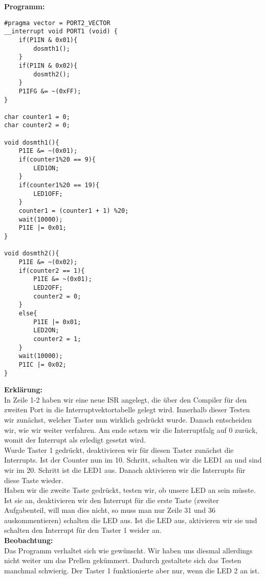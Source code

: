 \textbf{Programm:}\\

\begin{lstlisting}
#pragma vector = PORT2_VECTOR
__interrupt void PORT1 (void) {
	if(P1IN & 0x01){
		dosmth1();
	}
	if(P1IN & 0x02){
		dosmth2();
	}
	P1IFG &= ~(0xFF);
}

char counter1 = 0;
char counter2 = 0;

void dosmth1(){
	P1IE &= ~(0x01);
	if(counter1%20 == 9){
		LED1ON;
	}
	if(counter1%20 == 19){
		LED1OFF;
	}
	counter1 = (counter1 + 1) %20;
	wait(10000);
	P1IE |= 0x01;
}

void dosmth2(){
	P1IE &= ~(0x02);
	if(counter2 == 1){
		P1IE &= ~(0x01);
		LED2OFF;
		counter2 = 0;
	}
	else{
		P1IE |= 0x01;
		LED2ON;
		counter2 = 1;
	}
	wait(10000);
	P1IC |= 0x02;
}
\end{lstlisting}

\textbf{Erklärung:}\\

In Zeile 1-2 haben wir eine neue ISR angelegt, die über den Compiler für den zweiten Port in die Interruptvektortabelle gelegt wird. Innerhalb dieser Testen wir zunächst, welcher Taster nun wirklich gedrückt wurde. Danach entscheiden wir, wie wir weiter verfahren. Am ende setzen wir die Interruptfalg auf 0 zurück, womit der Interrupt als erledigt gesetzt wird.\\

Wurde Taster 1 gedrückt, deaktivieren wir für diesen Taster zunächst die Interrupts. Ist der Counter nun im 10. Schritt, schalten wir die LED1 an und sind wir im 20. Schritt ist die LED1 aus. Danach aktivieren wir die Interrupts für diese Taste wieder.\\

Haben wir die zweite Taste gedrückt, testen wir, ob unsere LED an sein müsste. Ist sie an, deaktivieren wir den Interrupt für die erste Taste (zweiter Aufgabenteil, will man dies nicht, so muss man nur Zeile 31 und 36 auskommentieren) schalten die LED aus. Ist die LED aus, aktivieren wir sie und schalten den Interrupt für den Taster 1 weider an.\\

\textbf{Beobachtung:}\\

Das Programm verhaltet sich wie gewünscht. Wir haben uns diesmal allerdings nicht weiter um das Prellen gekümmert. Dadurch gestaltete sich das Testen manchmal schwierig. Der Taster 1 funktionierte aber nur, wenn die LED 2 an ist.